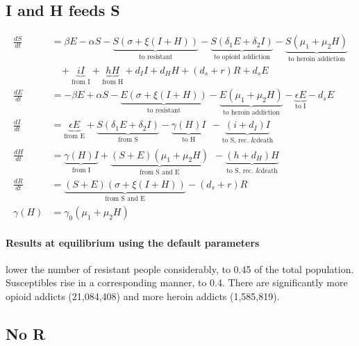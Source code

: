 \documentclass[11pt]{report}
\begin{document}
\subsection*{I and H feeds S}

\begin{align*}
\frac{dS}{dt} &= \beta E - \alpha S - \underbrace{S(\sigma + \xi(I+H))}_{\text{to resistant}} - \underbrace{S(\delta_1 E + \delta_2 I)}_{\text{to opioid addiction}} - \underbrace{S(\mu_1+\mu_2H)}_{\text{to heroin addiction}}\\
&\ \ \ \ + \underbrace{iI}_{\text{from I}} + \underbrace{hH}_{\text{from H}} 
+ d_I I + d_H H + (d_s+r) R + d_s E\\
\frac{dE}{dt} &= - \beta E + \alpha S - \underbrace{E(\sigma + \xi(I+H))}_{\text{to resistant}} - \underbrace{E(\mu_1 + \mu_2H)}_{\text{to heroin addiction}} - \underbrace{\epsilon E}_{\text{to I}} - d_s E\\
\frac{dI}{dt} &= \underbrace{\epsilon E}_{\text{from E}} + \underbrace{S(\delta_1E+\delta_2I)}_{\text{from S}} - \underbrace{\gamma(H)I}_{\text{to H}}\ \ 
- \underbrace{(i+d_I)I}_{\text{to S, rec. \& death}}\\
\frac{dH}{dt} &= \underbrace{\gamma(H)I}_{\text{from I}} + \underbrace{(S+E)(\mu_1+\mu_2H)}_{\text{from S and E}}\ \ - \underbrace{(h+d_H)H}_{\text{to S, rec. \& death}}\\
\frac{dR}{dt} &= \underbrace{(S+E)(\sigma + \xi(I+H))}_{\text{from S and E}} - (d_s+r)R\\
\gamma(H) &= \gamma_0(\mu_1+\mu_2H)
\end{align*}

\paragraph{Results at equilibrium using the default parameters} lower the number of resistant people considerably, to 0.45 of the total population. Susceptibles rise in a corresponding manner, to 0.4. There are significantly more opioid addicts (21,084,408) and more heroin addicts (1,585,819). 

\subsection*{No R}
\end{document}
